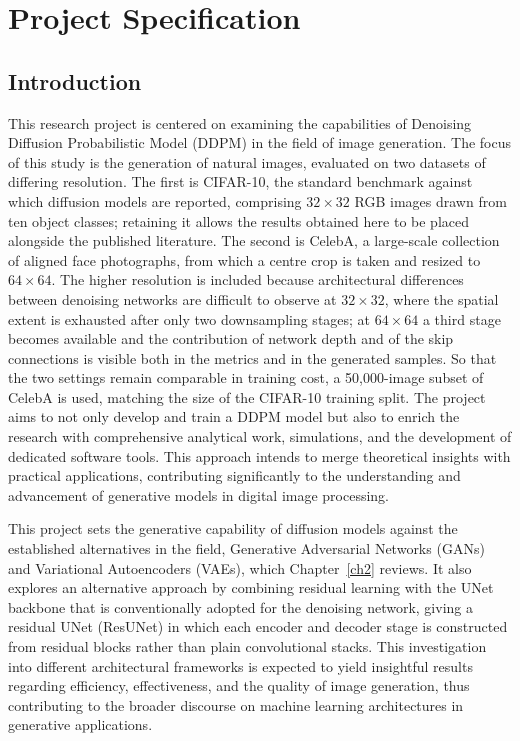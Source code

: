 \chapter{Project Specification}
\label{ch1}

\section{Introduction}

This research project is centered on examining the capabilities of Denoising Diffusion Probabilistic
Model (DDPM) in the field of image generation. The focus of this study is the generation of natural
images, evaluated on two datasets of differing resolution. The first is CIFAR-10, the standard
benchmark against which diffusion models are reported, comprising $32 \times 32$ RGB images drawn
from ten object classes; retaining it allows the results obtained here to be placed alongside the
published literature. The second is CelebA, a large-scale collection of aligned face photographs,
from which a centre crop is taken and resized to $64 \times 64$. The higher resolution is included
because architectural differences between denoising networks are difficult to observe at $32 \times
32$, where the spatial extent is exhausted after only two downsampling stages; at $64 \times 64$ a
third stage becomes available and the contribution of network depth and of the skip connections is
visible both in the metrics and in the generated samples. So that the two settings remain comparable
in training cost, a 50,000-image subset of CelebA is used, matching the size of the CIFAR-10
training split. The project aims to not only develop and train a DDPM model but also to enrich the
research with comprehensive analytical work, simulations, and the development of dedicated software
tools. This approach intends to merge theoretical insights with practical applications, contributing
significantly to the understanding and advancement of generative models in digital image processing.

This project sets the generative capability of diffusion models against the established alternatives
in the field, Generative Adversarial Networks (GANs) and Variational Autoencoders (VAEs), which
Chapter~\ref{ch2} reviews. It also explores an alternative approach by combining residual learning
with the UNet backbone that is conventionally adopted for the denoising network, giving a residual
UNet (ResUNet) in which each encoder and decoder stage is constructed from residual blocks rather
than plain convolutional stacks. This investigation into different architectural frameworks is
expected to yield insightful results regarding efficiency, effectiveness, and the quality of image
generation, thus contributing to the broader discourse on machine learning architectures in
generative applications.

